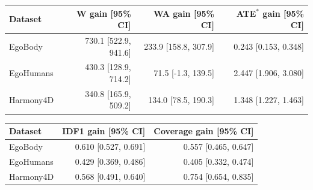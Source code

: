 \begin{tabular}{lrrr}
\toprule
Dataset & W gain [95\% CI] & WA gain [95\% CI] & ATE$^{*}$ gain [95\% CI] \\
\midrule
EgoBody & 730.1 [522.9, 941.6] & 233.9 [158.8, 307.9] & 0.243 [0.153, 0.348] \\
EgoHumans & 430.3 [128.9, 714.2] & 71.5 [-1.3, 139.5] & 2.447 [1.906, 3.080] \\
Harmony4D & 340.8 [165.9, 509.2] & 134.0 [78.5, 190.3] & 1.348 [1.227, 1.463] \\
\bottomrule
\end{tabular}

\vspace{4pt}

\begin{tabular}{lrr}
\toprule
Dataset & IDF1 gain [95\% CI] & Coverage gain [95\% CI] \\
\midrule
EgoBody & 0.610 [0.527, 0.691] & 0.557 [0.465, 0.647] \\
EgoHumans & 0.429 [0.369, 0.486] & 0.405 [0.332, 0.474] \\
Harmony4D & 0.568 [0.491, 0.640] & 0.754 [0.654, 0.835] \\
\bottomrule
\end{tabular}

